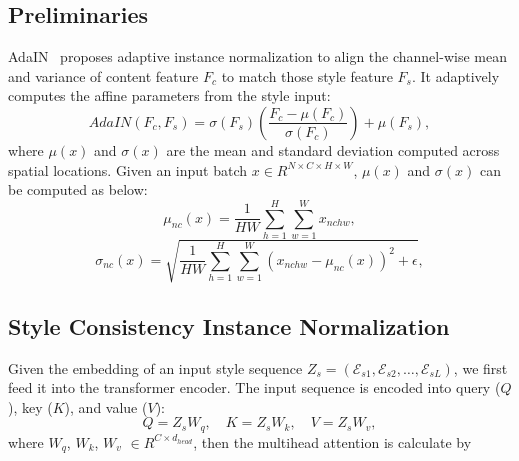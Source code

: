 \documentclass[times,twocolumn,final,authoryear]{elsarticle}
\begin{document}
\subsection{Preliminaries}
\label{3.2}
AdaIN~\citep{huang2017arbitrary} proposes adaptive instance normalization to align the channel-wise mean and variance of content feature $F_{c}$ to match those style feature $F_{s}$. It adaptively computes the affine parameters from the style input:
\begin{equation}
AdaIN(F_{c},F_{s}) =\sigma(F_{s})\left(\frac{F_{c}-\mu(F_{c})}{\sigma(F_{c})}\right)+\mu(F_{s}),
\end{equation}
where  $\mu(x)$ and $\sigma(x)$ are the mean and standard deviation computed across spatial locations.
Given an input batch
$x \in {R}^{N \times C \times H \times W}$, $\mu(x)$ and $\sigma(x)$ can be computed as below:
\begin{equation}
\mu_{n c}(x)=\frac{1}{H W} \sum_{h=1}^H \sum_{w=1}^W x_{n c h w},
\end{equation}
\begin{equation}
\sigma_{n c}(x)=\sqrt{\frac{1}{H W} \sum_{h=1}^H \sum_{w=1}^W\left(x_{n c h w}-\mu_{n c}(x)\right)^2+\epsilon},
\end{equation}


\subsection{Style Consistency Instance Normalization}
Given the embedding of an input style sequence $Z_{s}=(\mathcal{E}_{s 1}, \mathcal{E}_{s 2}, \ldots, \mathcal{E}_{s L})$, we first feed it into the transformer encoder.
The input sequence is encoded into query ($Q$),
key ($K$), and value ($V$):
\begin{equation}
Q=Z_s W_q, \quad K=Z_s W_k, \quad V=Z_s W_v,
\end{equation}
where $W_q$, $W_k$, $W_v$ $\in R^{C\times d_{head}}$, then the multihead attention is calculate by
\end{document}
